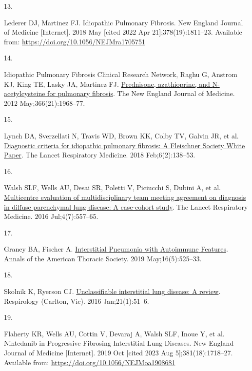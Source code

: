\documentclass[
]{article}
\newlength{\cslhangindent}
\newlength{\csllabelwidth}
\newlength{\cslentryspacingunit} %
\newenvironment{CSLReferences}[2] %
 {%
  \setlength{\parindent}{0pt}
  \ifodd #1
  \let\oldpar\par
  \def\par{\hangindent=\cslhangindent\oldpar}
  \fi
  \setlength{\parskip}{#2\cslentryspacingunit}
 }%
 {}
\newcommand{\CSLLeftMargin}[1]{\parbox[t]{\csllabelwidth}{#1}}
\newcommand{\CSLRightInline}[1]{\parbox[t]{\linewidth - \csllabelwidth}{#1}\break}
\begin{document}
\begin{CSLReferences}{0}{0}
\leavevmode{}%
\CSLLeftMargin{13. }%
\CSLRightInline{Lederer DJ, Martinez FJ. Idiopathic {Pulmonary} {Fibrosis}. New England Journal of Medicine {[}Internet{]}. 2018 May {[}cited 2022 Apr 21{]};378(19):1811--23. Available from: \url{https://doi.org/10.1056/NEJMra1705751}}

\leavevmode{}%
\CSLLeftMargin{14. }%
\CSLRightInline{Idiopathic Pulmonary Fibrosis Clinical Research Network, Raghu G, Anstrom KJ, King TE, Lasky JA, Martinez FJ. \href{https://doi.org/10.1056/NEJMoa1113354}{Prednisone, azathioprine, and {N}-acetylcysteine for pulmonary fibrosis}. The New England Journal of Medicine. 2012 May;366(21):1968--77. }

\leavevmode{}%
\CSLLeftMargin{15. }%
\CSLRightInline{Lynch DA, Sverzellati N, Travis WD, Brown KK, Colby TV, Galvin JR, et al. \href{https://doi.org/10.1016/S2213-2600(17)30433-2}{Diagnostic criteria for idiopathic pulmonary fibrosis: A {Fleischner} {Society} {White} {Paper}}. The Lancet Respiratory Medicine. 2018 Feb;6(2):138--53. }

\leavevmode{}%
\CSLLeftMargin{16. }%
\CSLRightInline{Walsh SLF, Wells AU, Desai SR, Poletti V, Piciucchi S, Dubini A, et al. \href{https://doi.org/10.1016/S2213-2600(16)30033-9}{Multicentre evaluation of multidisciplinary team meeting agreement on diagnosis in diffuse parenchymal lung disease: A case-cohort study}. The Lancet Respiratory Medicine. 2016 Jul;4(7):557--65. }

\leavevmode{}%
\CSLLeftMargin{17. }%
\CSLRightInline{Graney BA, Fischer A. \href{https://doi.org/10.1513/AnnalsATS.201808-565CME}{Interstitial {Pneumonia} with {Autoimmune} {Features}}. Annals of the American Thoracic Society. 2019 May;16(5):525--33. }

\leavevmode{}%
\CSLLeftMargin{18. }%
\CSLRightInline{Skolnik K, Ryerson CJ. \href{https://doi.org/10.1111/resp.12568}{Unclassifiable interstitial lung disease: {A} review}. Respirology (Carlton, Vic). 2016 Jan;21(1):51--6. }

\leavevmode{}%
\CSLLeftMargin{19. }%
\CSLRightInline{Flaherty KR, Wells AU, Cottin V, Devaraj A, Walsh SLF, Inoue Y, et al. Nintedanib in {Progressive} {Fibrosing} {Interstitial} {Lung} {Diseases}. New England Journal of Medicine {[}Internet{]}. 2019 Oct {[}cited 2023 Aug 5{]};381(18):1718--27. Available from: \url{https://doi.org/10.1056/NEJMoa1908681}}


\end{CSLReferences}
\end{document}
